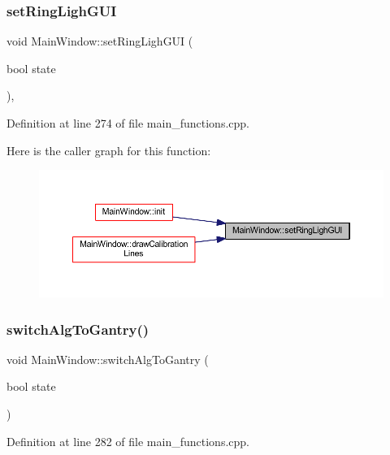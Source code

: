 \subsubsection{\texorpdfstring{setRingLighGUI}{setRingLighGUI}}
{\footnotesize\ttfamily void Main\+Window\+::set\+Ring\+Ligh\+G\+UI (\begin{DoxyParamCaption}\item[{bool}]{state }\end{DoxyParamCaption})\hspace{0.3cm}{\ttfamily [private]}, {\ttfamily [slot]}}



Definition at line 274 of file main\+\_\+functions.\+cpp.

Here is the caller graph for this function\+:
\nopagebreak
\begin{figure}[H]
\begin{center}
\leavevmode
\includegraphics[width=350pt]{class_main_window_a64190d66464e087f1df9ba7541ae52ff_icgraph}
\end{center}
\end{figure}
\mbox{\label{class_main_window_a28c0f3e2856ce2c44ba3ddad62a302a6}} 
\subsubsection{\texorpdfstring{switchAlgToGantry()}{switchAlgToGantry()}}
{\footnotesize\ttfamily void Main\+Window\+::switch\+Alg\+To\+Gantry (\begin{DoxyParamCaption}\item[{bool}]{state }\end{DoxyParamCaption})\hspace{0.3cm}{\ttfamily [private]}}



Definition at line 282 of file main\+\_\+functions.\+cpp.

